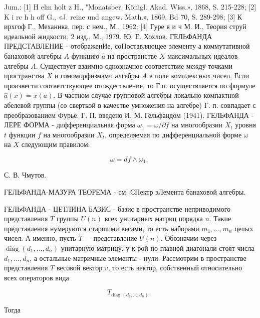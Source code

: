 \documentclass[10pt]{article}
\begin{document}
Jum.: [1] H elm holt z H., "Monatsber. Königl. Akad. Wiss.», 1868, S. 215-228; [2] K i rc h h off G., «J. reine und angew. Math.», 1869, Bd 70, S. 289-298; [3] К ирхгоф Г., Механика, пер. с нем., М., 1962; [4] Гуре в и ч М. И., Теория струй идеальной жидкости, 2 изд., М., 1979. Ю. Е. Хохлов. ГЕЛЬФАНДА ПРЕДСТАВЛЕНИЕ - отображенИе, соПоставляющее элементу $а$ коммутативной банаховой алгебры $A$ функцию $\hat{a}$ на пространстве $X$ максимальных идеалов алгебры $A$. Существует взаимно однозначное соответствие между точками пространства $X$ и гомоморфизмами алгебры $A$ в поле комплексных чисел. Если произвести соответствующее отождествление, то Г.п. осуществляется по формуле $\hat{a}(x)=x(a)$. В частном случае групповой алгебры локально компактной абелевой группы (со сверткой в качестве умножения на алгебре) Г. п. совпадает с преобразованием Фурье. Г. П. введено И. М. Гельфандом (1941). ГЕЛЬФАНДА - ЛЕРЕ ФОРМА - дифференциальная форма $\omega_{1}=\omega / \partial f$ на многообразии $X_{t}$ уровня $t$ функции $f$ на многообразии $X_{t}$, определяемая по дифференциальной форме $\omega$ на $X$ следующим правилом:



\[

\omega=d f \wedge \omega_{1} \text {. }

\]



С. В. Чмутов.



ГЕЛЬФАНДА-МАЗУРА ТЕОРЕМА - см. СПектр эЛемента банаховой алгебры.



ГЕЛЬФАНДА - ЦЕТЛИНА БАЗИС - базис в пространстве неприводимого представления $T$ группы $U(n)$ всех унитарных матриц порядка $n$. Такие представления нумеруются старшими весами, то есть наборами $m_{1}, \ldots, m_{n}$ целых чисел. А именно, пусть $T-$ представление $U(n)$. Обозначим через $\operatorname{diag}\left(d_{1}, \ldots, d_{n}\right)$ унитарную матрицу, у к-рой по главной диагонали стоят числа $d_{1}, \ldots, d_{n}$, а остальные матричные элементы - нули. Рассмотрим в пространстве представления $T$ весовой вектор $v$, то есть вектор, собственный относительно всех операторов вида



\[

T_{\text {diag }\left(d_{1}, \ldots, d_{n}\right)} \text {. }

\]



Тогда
\end{document}

